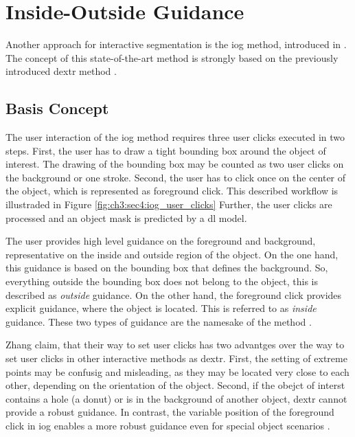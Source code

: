 
\section{Inside-Outside Guidance}\label{ord:ch3:sec4}

Another approach for interactive segmentation is the \gls{iog} method, introduced in \cite{Zha20-IOG}.
The concept of this state-of-the-art method is strongly based on the previously introduced \gls{dextr} method \cite{Man18-DEXTR}.

\subsection{Basis Concept}\label{ord:ch3:sec4:subsec1}
The user interaction of the \gls{iog} method requires three user clicks executed in two steps.
First, the user has to draw a tight bounding box around the object of interest. 
The drawing of the bounding box may be counted as two user clicks on the background or one stroke.
Second, the user has to click once on the center of the object, which is represented as foreground click. 
This described workflow is illustraded in Figure \ref{fig:ch3:sec4:iog_user_clicks}
Further, the user clicks are processed and an object mask is predicted by a \gls{dl} model.

The user provides high level guidance on the foreground and background, representative on the inside and outside region of the object.
On the one hand, this guidance is based on the bounding box that defines the background.
So, everything outside the bounding box does not belong to the object, this is described as \textit{outside} guidance.
On the other hand, the foreground click provides explicit guidance, where the object is located.
This is referred to as \textit{inside} guidance.
These two types of guidance are the namesake of the method .

Zhang \etal claim, that their way to set user clicks has two advantges over the way to set user clicks in other interactive methods as \gls{dextr}.
First, the setting of extreme points may be confusig and misleading, as they may be located very close to each other, depending on the orientation of the object.
Second, if the obejct of interst contains a hole (\ie a donut) or is in the background of another object, \gls{dextr} cannot provide a robust guidance.
In contrast, the variable position of the foreground click in \gls{iog} enables a more robust guidance even for special object scenarios \cite{Zha20-IOG}.

